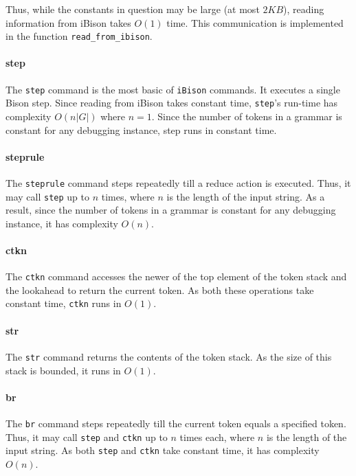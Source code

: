 Thus, while the constants in question may be large (at most $2 KB$), reading information from iBison takes $O(1)$ time.
This communication is implemented in the  function \verb|read_from_ibison|.

\paragraph{step}

The \verb|step| command is the most basic of \verb|iBison| commands. It executes a single Bison step. Since reading from iBison takes constant time, \verb|step|'s run-time has complexity $O(n|G|)$ where $n = 1$. Since the number of tokens in a grammar is constant for any debugging instance, step runs in constant time. 

\paragraph{steprule}

The \verb|steprule| command steps repeatedly till a reduce action is executed. Thus, it may call \verb|step| up to $n$ times, where $n$ is the length of the input string. As a result, since the number of tokens in a grammar is constant for any debugging instance, it has complexity $O(n)$.

\paragraph{ctkn}

The \verb|ctkn| command accesses the newer of the top element of the token stack and the lookahead to return the current token. As both these operations take constant time, \verb|ctkn| runs in $O(1)$.

\paragraph{str}

The \verb|str| command returns the contents of the token stack. As the size of this stack is bounded, it runs in $O(1)$.

\paragraph{br}

The \verb|br| command steps repeatedly till the current token equals a specified token. Thus, it may call \verb|step|  and \verb|ctkn| up to $n$ times each, where $n$ is the length of the input string. As both \verb|step| and \verb|ctkn| take constant time, it has complexity $O(n)$.

